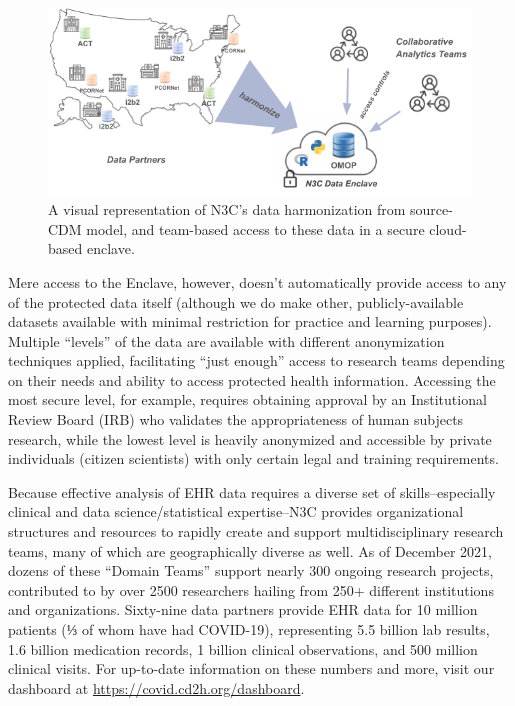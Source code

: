 \documentclass[
  letterpaper,
  DIV=11,
  numbers=noendperiod]{scrreprt}
\begin{document}
\begin{figure}

{\centering \includegraphics[width=1\textwidth,height=\textheight]{chapters/images/intro/image-02-harmonized.png}

}

\caption{\label{fig-intro-harmonized}A visual representation of N3C's
data harmonization from source-CDM model, and team-based access to these
data in a secure cloud-based enclave.}

\end{figure}

Mere access to the Enclave, however, doesn't automatically provide
access to any of the protected data itself (although we do make other,
publicly-available datasets available with minimal restriction for
practice and learning purposes). Multiple ``levels'' of the data are
available with different anonymization techniques applied, facilitating
``just enough'' access to research teams depending on their needs and
ability to access protected health information. Accessing the most
secure level, for example, requires obtaining approval by an
Institutional Review Board (IRB) who validates the appropriateness of
human subjects research, while the lowest level is heavily anonymized
and accessible by private individuals (citizen scientists) with only
certain legal and training requirements.

Because effective analysis of EHR data requires a diverse set of
skills--especially clinical and data science/statistical expertise--N3C
provides organizational structures and resources to rapidly create and
support multidisciplinary research teams, many of which are
geographically diverse as well. As of December 2021, dozens of these
``Domain Teams'' support nearly 300 ongoing research projects,
contributed to by over 2500 researchers hailing from 250+ different
institutions and organizations. Sixty-nine data partners provide EHR
data for 10 million patients (⅓ of whom have had COVID-19), representing
5.5 billion lab results, 1.6 billion medication records, 1 billion
clinical observations, and 500 million clinical visits. For up-to-date
information on these numbers and more, visit our dashboard at
\url{https://covid.cd2h.org/dashboard}.
\end{document}
